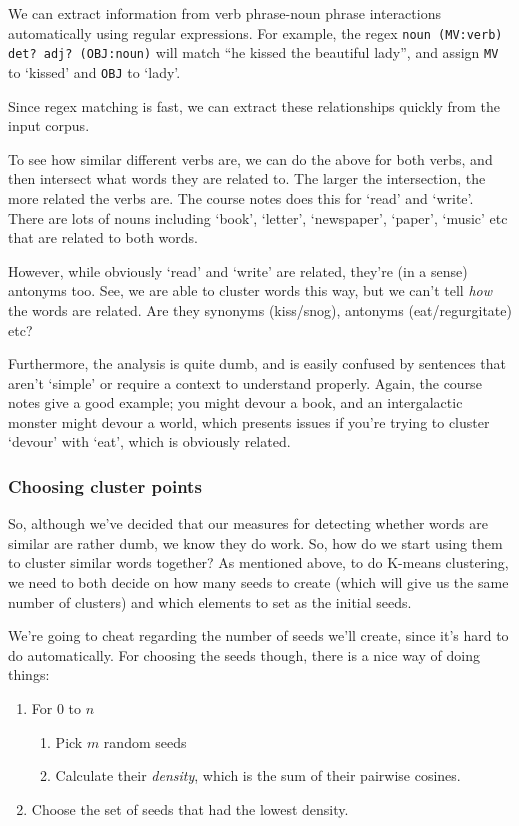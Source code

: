 We can extract information from verb phrase-noun phrase interactions
automatically using regular expressions. For example, the regex \texttt{noun
(MV:verb) det? adj? (OBJ:noun)} will match ``he kissed the beautiful lady'', and
assign \texttt{MV} to `kissed' and \texttt{OBJ} to `lady'.

Since regex matching is fast, we can extract these relationships quickly from
the input corpus.

To see how similar different verbs are, we can do the above for both verbs, and
then intersect what words they are related to. The larger the intersection, the
more related the verbs are. The course notes does this for `read' and `write'.
There are lots of nouns including `book', `letter', `newspaper', `paper',
`music' etc that are related to both words.

However, while obviously `read' and `write' are related, they're (in a sense)
antonyms too. See, we are able to cluster words this way, but we can't tell
\textit{how} the words are related. Are they synonyms (kiss/snog), antonyms
(eat/regurgitate) etc?

Furthermore, the analysis is quite dumb, and is easily confused by sentences
that aren't `simple' or require a context to understand properly. Again, the
course notes give a good example; you might devour a book, and an intergalactic
monster might devour a world, which presents issues if you're trying to cluster
`devour' with `eat', which is obviously related.

\subsubsection{Choosing cluster points}

So, although we've decided that our measures for detecting whether words are
similar are rather dumb, we know they do work. So, how do we start using them to
cluster similar words together? As mentioned above, to do K-means clustering, we
need to both decide on how many seeds to create (which will give us the same
number of clusters) and which elements to set as the initial seeds.

We're going to cheat regarding the number of seeds we'll create, since it's hard
to do automatically. For choosing the seeds though, there is a nice way of doing
things:

\begin{enumerate}
  \item For 0 to $n$
  \begin{enumerate}
    \item Pick $m$ random seeds 
    \item Calculate their \textit{density}, which is the sum of their pairwise 
      cosines.
  \end{enumerate}
  \item Choose the set of seeds that had the lowest density.
\end{enumerate}

